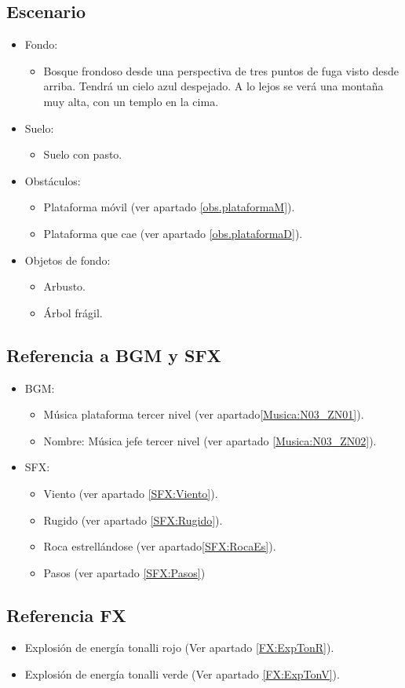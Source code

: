 \subsection{Escenario}
\begin{itemize} 
	\item Fondo:
\begin{itemize}
	\item Bosque frondoso desde una perspectiva de tres puntos de fuga visto desde arriba. Tendrá un cielo azul despejado. A lo lejos se verá una montaña muy alta, con un templo en la cima.
\end{itemize}
	\item Suelo:
		\begin{itemize}
			\item Suelo con pasto.
		\end{itemize}
	\item Obstáculos:
		\begin{itemize}
			\item Plataforma móvil (ver apartado \ref{obs.plataformaM}).
			\item Plataforma que cae (ver apartado \ref{obs.plataformaD}).
		\end{itemize}
	\item Objetos de fondo:
		\begin{itemize}
			\item Arbusto.
			\item Árbol frágil.
		\end{itemize}
\end{itemize}	
	\subsection{Referencia a BGM y SFX}
\begin{itemize}
	\item BGM:
		\begin{itemize}
			\item Música plataforma tercer nivel (ver apartado\ref{Musica:N03_ZN01}).
			\item Nombre: Música jefe tercer nivel (ver apartado \ref{Musica:N03_ZN02}).
		\end{itemize}
	\item SFX:
		\begin{itemize}
			\item Viento (ver apartado \ref{SFX:Viento}).
			\item Rugido (ver apartado \ref{SFX:Rugido}).
			\item Roca estrellándose (ver apartado\ref{SFX:RocaEs}).
			\item Pasos (ver apartado \ref{SFX:Pasos})
		\end{itemize}
\end{itemize} 
	\subsection{Referencia FX}
\begin{itemize}
	\item Explosión de energía tonalli rojo (Ver apartado \ref{FX:ExpTonR}).
	\item Explosión de energía tonalli verde (Ver apartado \ref{FX:ExpTonV}).
\end{itemize}